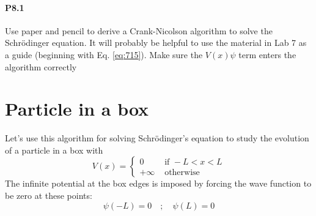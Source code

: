 \paragraph*{P8.1}
Use paper and pencil to derive a Crank-Nicolson algorithm to solve the
Schr{\"o}dinger equation. It will probably be helpful to use the material in
Lab 7 as a guide (beginning with Eq. \eqref{eq:715}). Make sure the $V(x)\psi$ term
enters the algorithm correctly
\section*{Particle in a box}
Let\rq s use this algorithm for solving Schr{\"o}dinger\rq s equation to study the evolution
of a particle in a box with
\begin{equation}\label{eq:82}
V(x)= \begin{cases}0 & \text { if }-L<x<L \\ +\infty & \text { otherwise }\end{cases}
\end{equation}
The infinite potential at the box edges is imposed by forcing the wave function to
be zero at these points:
\begin{equation}\label{eq:83}
\psi(-L)=0 \quad ; \quad \psi(L)=0
\end{equation}

